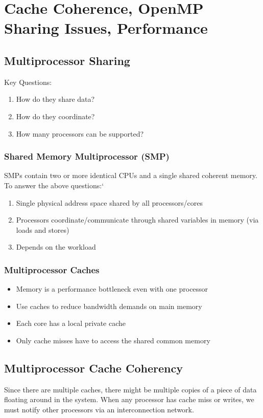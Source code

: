 \chapter{Cache Coherence, OpenMP Sharing Issues, Performance}

\section{Multiprocessor Sharing}
Key Questions:
\begin{enumerate}
    \item How do they share data?
    \item How do they coordinate?
    \item How many processors can be supported?
\end{enumerate}

\subsection{Shared Memory Multiprocessor (SMP)}
SMPs contain two or more identical CPUs and a single shared coherent memory. To answer the above questions:`
\begin{enumerate}
    \item Single physical address space shared by all processors/cores
    \item Processors coordinate/communicate through shared variables in memory (via loads and stores)
    \item Depends on the workload
\end{enumerate}

\subsection{Multiprocessor Caches}
\begin{itemize}
    \item Memory is a performance bottleneck even with one processor
    \item Use caches to reduce bandwidth demands on main memory
    \item Each core has a local private cache
    \item Only cache misses have to access the shared common memory
\end{itemize}


\section{Multiprocessor Cache Coherency}
Since there are multiple caches, there might be multiple copies of a piece of data floating around in the system. When any processor has cache miss or writes, we must notify other processors via an interconnection network.

